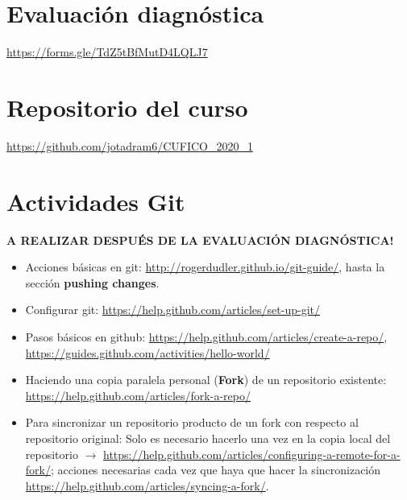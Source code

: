 \documentclass[10.5pt]{article}
\begin{document}
\section{Evaluación diagnóstica}

\url{https://forms.gle/TdZ5tBfMutD4LQLJ7}

\section{Repositorio del curso}

\url{https://github.com/jotadram6/CUFICO_2020_1}

\section{Actividades Git}

{\textbf{A REALIZAR DESPUÉS DE LA EVALUACIÓN DIAGNÓSTICA!}}

\begin{itemize}
\item Acciones básicas en git: \url{http://rogerdudler.github.io/git-guide/}, hasta la sección {\textbf{pushing changes}}.
\item Configurar git: \url{https://help.github.com/articles/set-up-git/}
\item Pasos básicos en github: \url{https://help.github.com/articles/create-a-repo/}, \url{https://guides.github.com/activities/hello-world/}
\item Haciendo una copia paralela personal ({\textbf{Fork}}) de un repositorio existente: \url{https://help.github.com/articles/fork-a-repo/}
\item Para sincronizar un repositorio producto de un fork con respecto al repositorio original: Solo es necesario hacerlo una vez en la copia local del repositorio $\rightarrow$ \url{https://help.github.com/articles/configuring-a-remote-for-a-fork/}; acciones necesarias cada vez que haya que hacer la sincronización \url{https://help.github.com/articles/syncing-a-fork/}.
\end{itemize}
\end{document}
